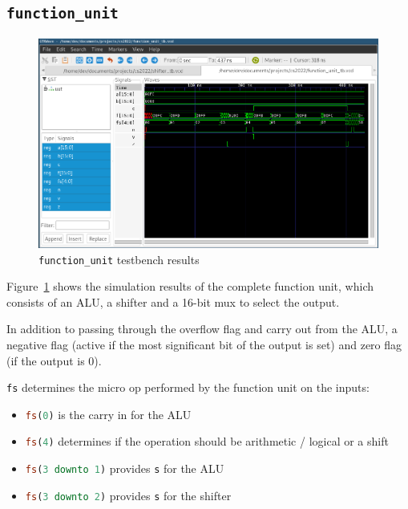 \documentclass[a4paper]{article}
\numberwithin{figure}{section}
\numberwithin{table}{section}
\newcommand{\mi}{\mintinline}
\begin{document}
\newpage
\subsection{\mi{c}{function_unit}}
\begin{figure}[h!]
	\centering
	\includegraphics[width=\textwidth]{function_unit_tb}
	\caption{\mi{c}{function_unit} testbench results}
	\label{fig:fnu}
\end{figure}
Figure~\ref{fig:fnu} shows the simulation results of the complete function unit, which consists of
an ALU, a shifter and a 16-bit mux to select the output.

In addition to passing through the overflow flag and carry out from the ALU, a negative flag 
(active if the most significant bit of the output is set) and zero flag (if the output is 0).

\mi{c}{fs} determines the micro op performed by the function unit on the inputs:
\begin{itemize}
	\item \mi{vhdl}{fs(0)} is the carry in for the ALU
	\item \mi{vhdl}{fs(4)} determines if the operation should be arithmetic / logical or a shift
	\item \mi{vhdl}{fs(3 downto 1)} provides \mi{c}{s} for the ALU
	\item \mi{vhdl}{fs(3 downto 2)} provides \mi{c}{s} for the shifter
\end{itemize}
\end{document}

